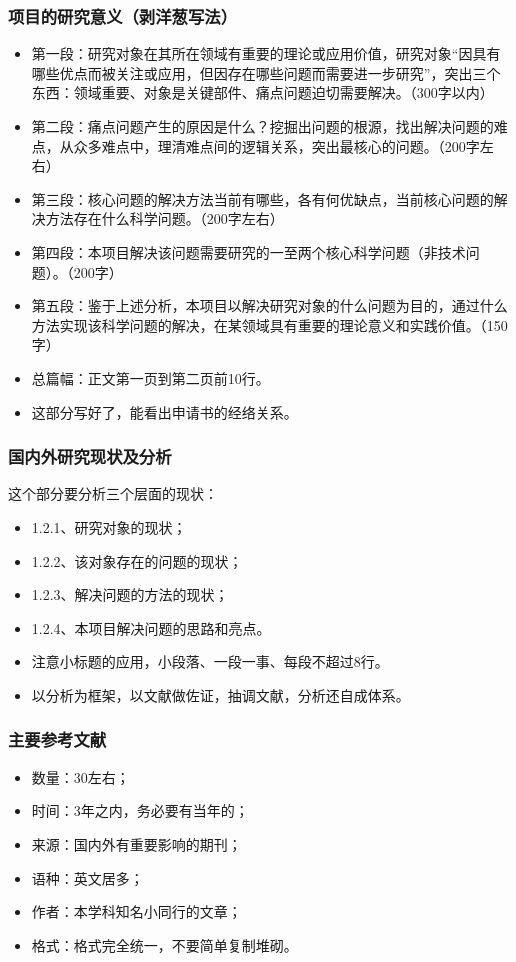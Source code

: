 \subsubsection{项目的研究意义（剥洋葱写法）}
\begin{itemize}
\item 第一段：研究对象在其所在领域有重要的理论或应用价值，研究对象“因具有哪些优点而被关注或应用，但因存在哪些问题而需要进一步研究”，突出三个东西：领域重要、对象是关键部件、痛点问题迫切需要解决。（300字以内）

\item 第二段：痛点问题产生的原因是什么？挖掘出问题的根源，找出解决问题的难点，从众多难点中，理清难点间的逻辑关系，突出最核心的问题。（200字左右）

\item 第三段：核心问题的解决方法当前有哪些，各有何优缺点，当前核心问题的解决方法存在什么科学问题。（200字左右）

\item 第四段：本项目解决该问题需要研究的一至两个核心科学问题（非技术问题）。（200字）

\item 第五段：鉴于上述分析，本项目以解决研究对象的什么问题为目的，通过什么方法实现该科学问题的解决，在某领域具有重要的理论意义和实践价值。（150字）

\item 总篇幅：正文第一页到第二页前10行。

\item {\color{red} 这部分写好了，能看出申请书的经络关系。}
\end{itemize}


\subsubsection{国内外研究现状及分析}
这个部分要分析三个层面的现状：
\begin{itemize}
\item 1.2.1、研究对象的现状；
\item 1.2.2、该对象存在的问题的现状；
\item 1.2.3、解决问题的方法的现状；
\item 1.2.4、本项目解决问题的思路和亮点。
\item 注意小标题的应用，小段落、一段一事、每段不超过8行。
\item 以分析为框架，以文献做佐证，抽调文献，分析还自成体系。
\end{itemize}


\subsubsection{主要参考文献}
\begin{itemize}
\item 数量：30左右；
\item 时间：3年之内，务必要有当年的；
\item 来源：国内外有重要影响的期刊；
\item 语种：英文居多；
\item 作者：本学科知名小同行的文章；
\item 格式：格式完全统一，不要简单复制堆砌。
\end{itemize}



